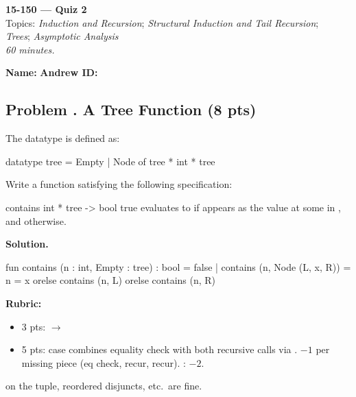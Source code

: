 \documentclass[crop=false]{standalone}
\newif\ifsol
\newenvironment{solution}
    {\par\color{solution_color}\begin{framed}\textbf{Solution.}\par}
    {\end{framed}}
\newcommand{\quizproblem}[3]{%
  \needspace{5\baselineskip}%
  \stepcounter{problem}%
  \ifsol
    \subsection*{Problem \arabic{problem}. #1 \hfill \timing{#2} \quad (#3 pts)}%
  \else
    \subsection*{Problem \arabic{problem}. #1 \hfill (#3 pts)}%
  \fi
}
\newcommand{\answerspace}[1]{\ifsol\else\vspace{#1}\par\fi}
\begin{document}
\begin{center}
  {\Large \textbf{15-150 --- Quiz 2}} \\
  \vspace{4pt}
  Topics: \textit{Induction and Recursion}; \textit{Structural Induction and Tail Recursion}; \\
  \textit{Trees}; \textit{Asymptotic Analysis} \\
  \vspace{4pt}
  \textit{60 minutes.}
\end{center}

\vspace{1em}

\noindent\textbf{Name:} \hrulefill \hspace{2em} \textbf{Andrew ID:} \hrulefill

\vspace{1em}


\quizproblem{A Tree Function}{6}{8}

The  datatype is defined as:

\begin{codeblock}
  datatype tree = Empty | Node of tree * int * tree
\end{codeblock}

Write a function  satisfying the following specification:

\spec
  {contains}
  {int * tree -> bool}
  {true}
  { evaluates to  if  appears as
   the value at some  in , and  otherwise.}

\answerspace{6cm}

\begin{solution}
\begin{codeblock}
  fun contains (n : int, Empty : tree) : bool = false
    | contains (n, Node (L, x, R)) =
        n = x orelse contains (n, L) orelse contains (n, R)
\end{codeblock}

\textbf{Rubric:}
\begin{itemize}
  \item 3 pts:  $\to$ 
  \item 5 pts:  case combines equality check with both
    recursive calls via . $-1$ per missing piece (eq check,
     recur,  recur). : $-2$.
\end{itemize}
 on the tuple, reordered disjuncts, etc.\ are fine.
\end{solution}
\end{document}
